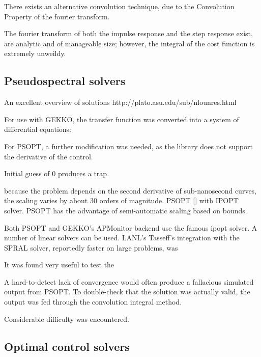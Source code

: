 \documentclass[fleqn,10pt]{paper}
\begin{document}
There exists an alternative convolution technique, due to the Convolution Property of the fourier transform.

The fourier transform of both the impulse response and the step response exist, are analytic and of manageable size; however, the integral of the cost function is extremely unweildy.

\subsection{Pseudospectral solvers}

An excellent overview of solutions http://plato.asu.edu/sub/nlounres.html

For use with GEKKO, the transfer function was converted into a system of differential equations:

For PSOPT, a further modification was needed, as the library does not support the derivative of the control.

Initial guess of 0 produces a trap.

because the problem depends on the second derivative of sub-nanosecond curves, the scaling varies by about 30 orders of magnitude.
PSOPT [] with IPOPT\cite{implementation2006} solver. PSOPT has the advantage of semi-automatic scaling based on bounds. 

Both PSOPT and GEKKO's APMonitor backend use the famous ipopt solver. A number of linear solvers can be used. LANL's Tasseff's integration with the SPRAL solver, reportedly faster on large problems, was 

It was found very useful to test the 

A hard-to-detect lack of convergence would often produce a fallacious simulated output from PSOPT. To double-check that the solution was actually valid, the output was fed through the convolution integral method.

Considerable difficulty was encountered. 



\subsection{Optimal control solvers}



\end{document}
